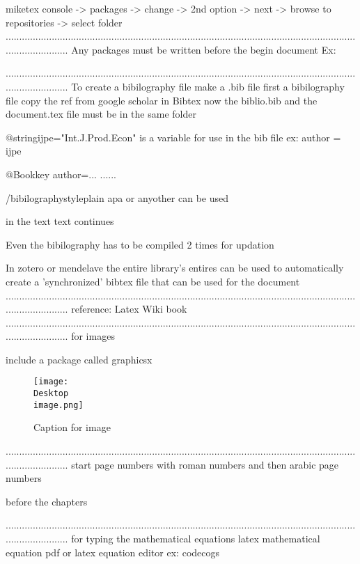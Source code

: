 miketex console -> packages -> change -> 2nd option -> next -> browse to repositories -> select folder
........................................................................................................................................................
Any packages must be written before the begin document
Ex:
\usepackage{setspace}

\doublespacing
........................................................................................................................................................
To create a bibilography file
make a .bib file first a bibilography file
copy the ref from google scholar in Bibtex
now the biblio.bib and the document.tex file must be in the same folder

@string{ijpe="Int.J.Prod.Econ"} is a variable for use in the bib file ex: author = ijpe

@Book{key
author={...}
......
}

/bibilographystyle{plain} apa or anyother can be used


in the text \cite{key1,key2,..} text continues

Even the bibilography has to be compiled 2 times for updation


In zotero or mendelave the entire library's entires can be used to automatically create a 'synchronized' bibtex file that can be used for the document
........................................................................................................................................................
reference: Latex Wiki book
........................................................................................................................................................
for images
\listoffigures   

include a package called graphicsx
\begin{figure}
\texttt{[image: \\Desktop\\image.png]}      %
\caption{Caption for image}
\end{figure}
........................................................................................................................................................
start page numbers with roman numbers and then arabic page numbers

before the chapters

........................................................................................................................................................
for typing the mathematical equations
latex mathematical equation pdf
or latex equation editor ex: codecogs


